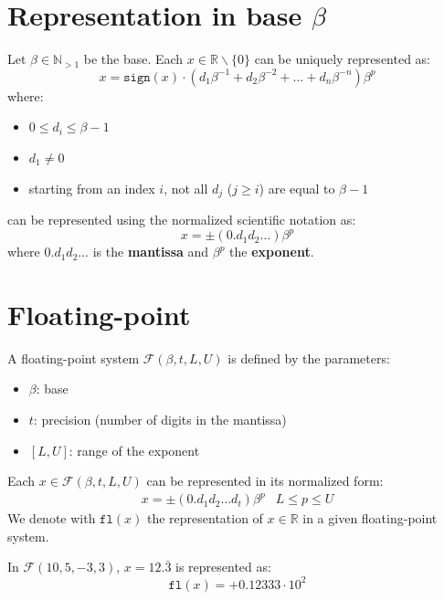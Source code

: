 \section{Representation in base \texorpdfstring{$\beta$}{B}}

Let $\beta \in \mathbb{N}_{> 1}$ be the base.
Each $x \in \mathbb{R} \smallsetminus \{0\}$ can be uniquely represented as:
\[ \label{eq:finnum_b_representation}
    x = \texttt{sign}(x) \cdot (d_1\beta^{-1} + d_2\beta^{-2} + \dots + d_n\beta^{-n})\beta^p
\]
where:
\begin{itemize}
    \item $0 \leq d_i \leq \beta-1$
    \item $d_1 \neq 0$
    \item starting from an index $i$, not all $d_j$ ($j \geq i$) are equal to $\beta-1$
\end{itemize}
%
 can be represented using the normalized scientific notation as: 
\[
    x = \pm (0.d_1d_2\dots) \beta^p
\]
where $0.d_1d_2\dots$ is the \textbf{mantissa} and $\beta^p$ the \textbf{exponent}. 



\section{Floating-point}
A floating-point system $\mathcal{F}(\beta, t, L, U)$ is defined by the parameters: 
\begin{itemize}
    \item $\beta$: base
    \item $t$: precision (number of digits in the mantissa)
    \item $[L, U]$: range of the exponent
\end{itemize}

Each $x \in \mathcal{F}(\beta, t, L, U)$ can be represented in its normalized form:
\begin{eqnarray}
    x = \pm (0.d_1d_2 \dots d_t) \beta^p & L \leq p \leq U
\end{eqnarray}
We denote with $\texttt{fl}(x)$ the representation of $x \in \mathbb{R}$ in a given floating-point system.

\begin{example}
    In $\mathcal{F}(10, 5, -3, 3)$, $x=12.\bar{3}$ is represented as:
    \begin{equation*}
        \texttt{fl}(x) = + 0.12333 \cdot 10^2
    \end{equation*}
\end{example}


